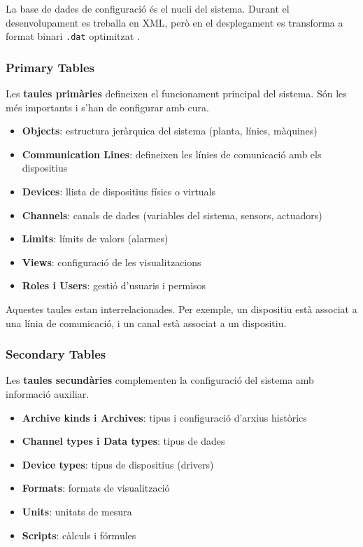 \documentclass[a4paper,11pt,DIV=13,headings=normal,abstract=true,twoside=semi]{article}
\begin{document}
La base de dades de configuració és el nucli del sistema. Durant el desenvolupament es treballa en XML, però en el desplegament es transforma a format binari \texttt{.dat} optimitzat \cite{rapidscada_database}.


\subsubsection*{Primary Tables}

Les \textbf{taules primàries} defineixen el funcionament principal del sistema. Són les més importants i s'han de configurar amb cura.

\begin{itemize}
    \item \textbf{Objects}: estructura jeràrquica del sistema (planta, línies, màquines)
    \item \textbf{Communication Lines}: defineixen les línies de comunicació amb els dispositius
    \item \textbf{Devices}: llista de dispositius físics o virtuals
    \item \textbf{Channels}: canals de dades (variables del sistema, sensors, actuadors)
    \item \textbf{Limits}: límits de valors (alarmes)
    \item \textbf{Views}: configuració de les visualitzacions
    \item \textbf{Roles i Users}: gestió d'usuaris i permisos
\end{itemize}

Aquestes taules estan interrelacionades. Per exemple, un dispositiu està associat a una línia de comunicació, i un canal està associat a un dispositiu.

\subsubsection*{Secondary Tables}

Les \textbf{taules secundàries} complementen la configuració del sistema amb informació auxiliar.

\begin{itemize}
    \item \textbf{Archive kinds i Archives}: tipus i configuració d'arxius històrics
    \item \textbf{Channel types i Data types}: tipus de dades
    \item \textbf{Device types}: tipus de dispositius (drivers)
    \item \textbf{Formats}: formats de visualització
    \item \textbf{Units}: unitats de mesura
    \item \textbf{Scripts}: càlculs i fórmules
\end{itemize}
\end{document}
